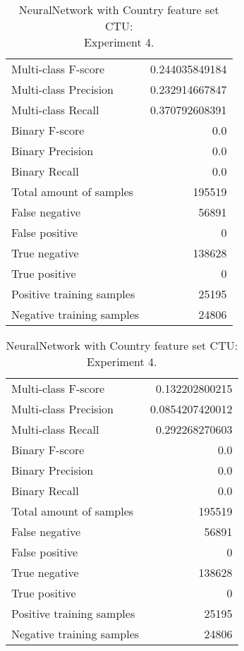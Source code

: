 \begin{table}[H]
\begin{minipage}{0.5\textwidth}
\caption{NeuralNetwork with Country feature set CTU: \\Experiment 3.}
\centering
\begin{tabular}{l r}
\toprule
Multi-class F-score & 0.244035849184 \\
Multi-class Precision & 0.232914667847 \\
Multi-class Recall & 0.370792608391 \\
\midrule
Binary F-score & 0.0 \\
Binary Precision & 0.0 \\
Binary Recall & 0.0 \\
\midrule
Total amount of samples & 195519 \\
False negative & 56891 \\
False positive & 0 \\
True negative & 138628 \\
True positive & 0 \\
\midrule
Positive training samples & 25195 \\
Negative training samples & 24806 \\
\bottomrule
\end{tabular}
\end{minipage}
\hfillx
\begin{minipage}{0.5\textwidth}
\caption{NeuralNetwork with Country feature set CTU: \\Experiment 4.}
\centering
\begin{tabular}{l r}
\toprule
Multi-class F-score & 0.132202800215 \\
Multi-class Precision & 0.0854207420012 \\
Multi-class Recall & 0.292268270603 \\
\midrule
Binary F-score & 0.0 \\
Binary Precision & 0.0 \\
Binary Recall & 0.0 \\
\midrule
Total amount of samples & 195519 \\
False negative & 56891 \\
False positive & 0 \\
True negative & 138628 \\
True positive & 0 \\
\midrule
Positive training samples & 25195 \\
Negative training samples & 24806 \\
\bottomrule
\end{tabular}
\end{minipage}
\end{table}
